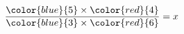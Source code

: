\documentclass[preview]{standalone}
\begin{document}
\begin{align*}
\frac{\color{blue}{5} \times \color{red}{4}}{\color{blue}{3} \times \color{red}{6}} = x
\end{align*}
\end{document}

